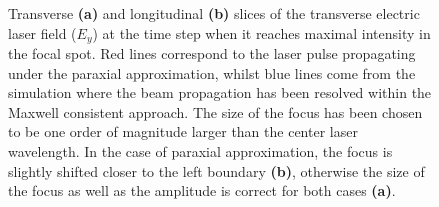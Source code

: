 \begin{figure}[h!]
	\centering
	\hspace{1mm}
	\caption{Transverse \textbf{(a)} and longitudinal \textbf{(b)} slices of the transverse electric laser field ($ E_{y} $) at the time step when it reaches maximal intensity in the focal spot. Red lines correspond to the laser pulse propagating under the paraxial approximation, whilst blue lines come from the simulation where the beam propagation has been resolved within the Maxwell consistent approach. The size of the focus has been chosen to be one order of magnitude larger than the center laser wavelength. In the case of paraxial approximation, the focus is slightly shifted closer to the left boundary \textbf{(b)}, otherwise the size of the focus as well as the amplitude is correct for both cases \textbf{(a)}.}
	\label{fig:6}
\end{figure}